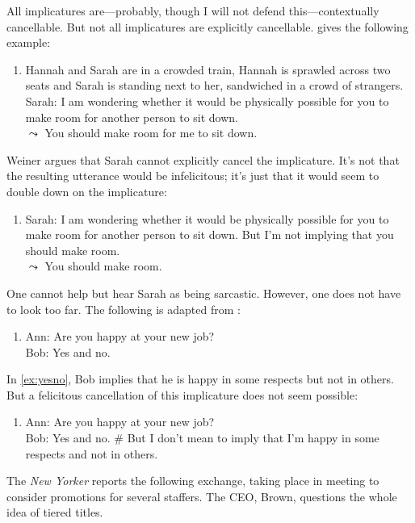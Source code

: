 \documentclass[12pt]{article}
\begin{document}
All implicatures are---probably, though I will not defend this---contextually cancellable. But not all implicatures are explicitly cancellable. \textcite{weiner_are_2006} gives the following example:

\begin{enumerate}[resume]
  \item\label{ex:train}
    Hannah and Sarah are in a crowded train, Hannah is sprawled across two seats and Sarah is standing next to her, sandwiched in a crowd of strangers.\\
    Sarah: I am wondering whether it would be physically possible for you to make room for another person to sit down.\\
    $\leadsto$ You should make room for me to sit down.
\end{enumerate}
%
Weiner argues that Sarah cannot explicitly cancel the implicature. It's not that the resulting utterance would be infelicitous; it's just that it would seem to double down on the implicature:

\begin{enumerate}[resume]
  \item\label{ex:train2}
    Sarah: I am wondering whether it would be physically possible for you to make room for another person to sit down. But I'm not implying that you should make room.\\
    $\leadsto$ You should make room.
\end{enumerate}
%
One cannot help but hear Sarah as being sarcastic. However, one does not have to look too far. The following is adapted from \textcite{akerman_infelicitous_2015}:

\begin{enumerate}[resume]
  \item\label{ex:yesno}
    Ann: Are you happy at your new job?\\
    Bob: Yes and no.
\end{enumerate}
%
In \ref{ex:yesno}, Bob implies that he is happy in some respects but not in others. But a felicitous cancellation of this implicature does not seem possible:

\begin{enumerate}[resume]
  \item\label{ex:yesno2}
    Ann: Are you happy at your new job?\\
    Bob: Yes and no. \# But I don't mean to imply that I'm happy in some respects and not in others.
\end{enumerate}
%
The \textit{New Yorker} reports the following exchange, taking place in meeting to consider promotions for several staffers. The CEO, Brown, questions the whole idea of tiered titles.
\end{document}
